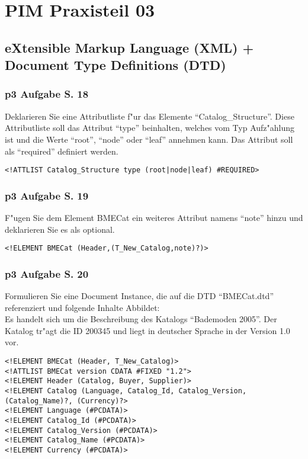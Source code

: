 

\chapter{PIM Praxisteil 03}

\section{eXtensible Markup Language (XML) + Document Type Definitions (DTD)}


\subsection{p3 Aufgabe S. 18}
Deklarieren Sie eine Attributliste f"ur das Elemente "`Catalog\_Structure"'.
Diese Attributliste soll das Attribut "`type"' beinhalten, welches vom Typ Aufz"ahlung ist und die Werte "`root"', "`node"' oder "`leaf"' annehmen kann.
Das Attribut soll als "`required"' definiert werden.\\

\lstset{style=customXML}
\begin{lstlisting}
<!ATTLIST Catalog_Structure type (root|node|leaf) #REQUIRED>
\end{lstlisting}

\subsection{p3 Aufgabe S. 19}
F"ugen Sie dem Element BMECat ein weiteres Attribut namens "`note"' hinzu und deklarieren Sie es als optional.\\

\lstset{style=customXML}
\begin{lstlisting}
<!ELEMENT BMECat (Header,(T_New_Catalog,note)?)>
\end{lstlisting}


\subsection{p3 Aufgabe S. 20}

Formulieren Sie eine Document Instance, die auf die DTD "`BMECat.dtd"' referenziert und folgende Inhalte Abbildet:\\
Es handelt sich um die Beschreibung des Katalogs "`Bademoden 2005"'.
Der Katalog tr"agt die ID 200345 und liegt in deutscher Sprache in der Version 1.0 vor.

\lstset{style=customXML} %
\begin{lstlisting}
<!ELEMENT BMECat (Header, T_New_Catalog)>
<!ATTLIST BMECat version CDATA #FIXED "1.2">
<!ELEMENT Header (Catalog, Buyer, Supplier)>
<!ELEMENT Catalog (Language, Catalog_Id, Catalog_Version, (Catalog_Name)?, (Currency)?>
<!ELEMENT Language (#PCDATA)>
<!ELEMENT Catalog_Id (#PCDATA)>
<!ELEMENT Catalog_Version (#PCDATA)>
<!ELEMENT Catalog_Name (#PCDATA)>
<!ELEMENT Currency (#PCDATA)>
\end{lstlisting}

